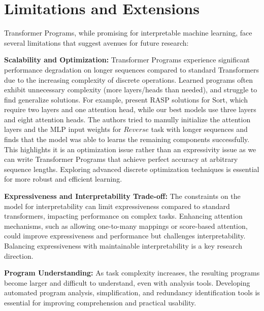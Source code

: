 
\section{Limitations and Extensions}
\label{ch:limitations-and-extensions}


Transformer Programs, while promising for interpretable machine learning, face several limitations that suggest avenues for future research:

\textbf{Scalability and Optimization:}  Transformer Programs experience significant performance degradation on longer sequences compared to standard Transformers due to the increasing complexity of discrete operations. Learned programs often exhibit unnecessary complexity (more layers/heads than needed), and struggle to find generalize solutions. For example, \textcite{weiss2021thinking} present RASP solutions for Sort, which require two layers and one attention head, while our best models use three layers and eight attention heads. The authors tried to manully initialize the attention layers and the MLP input weights for $Reverse$ task with longer sequences and finds that the model was able to learns the remaining components successfully. This highlights it is an optimization issue rather than an expressivity issue as we can write Transformer Programs that achieve perfect accuracy at arbitrary sequence lengths. Exploring advanced discrete optimization techniques is essential for more robust and efficient learning.

\textbf{Expressiveness and Interpretability Trade-off:} The constraints on the model for interpretability can limit expressiveness compared to standard transformers, impacting performance on complex tasks. Enhancing attention mechanisms, such as allowing one-to-many mappings or score-based attention, could improve expressiveness and performance but challenges interpretability. Balancing expressiveness with maintainable interpretability is a key research direction. 

\textbf{Program Understanding:} As task complexity increases, the resulting programs become larger and difficult to understand, even with analysis tools. Developing automated program analysis, simplification, and redundancy identification tools is essential for improving comprehension and practical usability.


